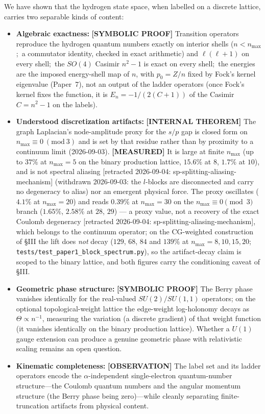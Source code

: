 \documentclass[aps,pra,twocolumn,superscriptaddress,longbibliography]{revtex4-2}
\newcommand{\gvc}[2]{#2}
\begin{document}
We have shown that the hydrogen state space, when labelled on a discrete lattice, carries two separable kinds of content:
\begin{itemize}
\item \textbf{Algebraic exactness:} \textbf{[SYMBOLIC PROOF]} \gvc{p1-ladder-exact}{Transition operators reproduce the hydrogen quantum numbers exactly on interior shells ($n < n_{\max}$;\ a commutator identity, checked in exact arithmetic) and $\ell(\ell+1)$ on every shell};\ the $SO(4)$ Casimir $n^2-1$ is exact on every shell;\ the energies are the imposed energy-shell map of $n$, with $p_0 = Z/n$ fixed by Fock's kernel eigenvalue (Paper~7), not an output of the ladder operators (once Fock's kernel fixes the function, it is $E_n = -1/(2(C+1))$ of the Casimir $C = n^2-1$ on the labels).
\item \textbf{Understood discretization artifacts:} \textbf{[INTERNAL THEOREM]} The graph Laplacian's node-amplitude proxy for the $s/p$ gap is closed form on $n_{\max} \equiv 0 \ (\mathrm{mod}\ 3)$ and is set by that residue rather than by proximity to a continuum limit (2026-09-03).  \textbf{[MEASURED]} It is large at finite $n_{\max}$ (up to $37\%$ at $n_{\max}=5$ on the binary production lattice, $15.6\%$ at $8$, $1.7\%$ at $10$), and is not spectral aliasing [retracted 2026-09-04: sp-splitting-aliasing-mechanism] (withdrawn 2026-09-03: the $l$-blocks are disconnected and carry no degeneracy to alias) nor an emergent physical force. The proxy oscillates ($4.1\%$ at $n_{\max}=20$) and reads $0.39\%$ at $n_{\max}=30$ on the $n_{\max}\equiv 0 \pmod 3$ branch ($1.65\%$, $2.58\%$ at $28$, $29$) --- a proxy value, not a recovery of the exact Coulomb degeneracy [retracted 2026-09-04: sp-splitting-aliasing-mechanism], which belongs to the continuum operator; on the CG-weighted construction of \S III the lift does \emph{not} decay ($129$, $68$, $84$ and $139\%$ at $n_{\max} = 8, 10, 15, 20$; \texttt{tests/test\_paper1\_block\_spectrum.py}), so the artifact-decay claim is scoped to the binary lattice, and both figures carry the conditioning caveat of \S III.
\item \textbf{Geometric phase structure:} \textbf{[SYMBOLIC PROOF]} The Berry phase vanishes identically for the real-valued $SU(2)/SU(1,1)$ operators; on the optional topological-weight lattice the edge-weight log-holonomy decays as $\Theta \propto n^{-1}$, measuring the variation (a discrete gradient) of that weight function (it vanishes identically on the binary production lattice). Whether a $U(1)$ gauge extension can produce a genuine geometric phase with relativistic scaling remains an open question.
\item \textbf{Kinematic completeness:} \textbf{[OBSERVATION]} The label set and its ladder operators encode the $\alpha$-independent single-electron quantum-number structure---the Coulomb quantum numbers and the angular momentum structure (the Berry phase being zero)---while cleanly separating finite-truncation artifacts from physical content.
\end{itemize}
\end{document}
